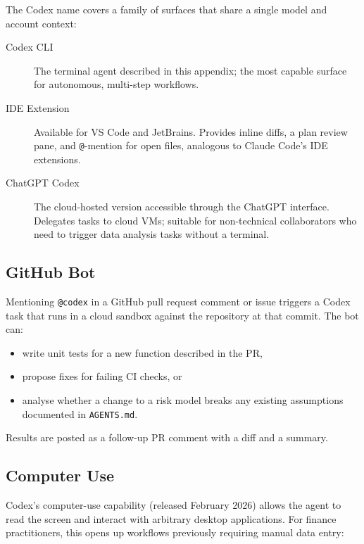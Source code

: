 The Codex name covers a family of surfaces that share a single model and
account context:

\begin{description}
  \item[Codex CLI] The terminal agent described in this appendix; the most
        capable surface for autonomous, multi-step workflows.

  \item[IDE Extension] Available for VS Code and JetBrains.  Provides inline
        diffs, a plan review pane, and \texttt{@}-mention for open files,
        analogous to Claude Code's IDE extensions.

  \item[ChatGPT Codex] The cloud-hosted version accessible through the
        ChatGPT interface.  Delegates tasks to cloud VMs; suitable for
        non-technical collaborators who need to trigger data analysis tasks
        without a terminal.
\end{description}

\subsection{GitHub Bot}
\label{app:codex:github-bot}

Mentioning \texttt{@codex} in a GitHub pull request comment or issue triggers
a Codex task that runs in a cloud sandbox against the repository at that
commit.  The bot can:

\begin{itemize}
  \item write unit tests for a new function described in the PR,
  \item propose fixes for failing CI checks, or
  \item analyse whether a change to a risk model breaks any existing
        assumptions documented in \texttt{AGENTS.md}.
\end{itemize}

Results are posted as a follow-up PR comment with a diff and a summary.

\subsection{Computer Use}
\label{app:codex:computer-use}

Codex's computer-use capability (released February 2026) allows the agent to
read the screen and interact with arbitrary desktop applications.  For finance
practitioners, this opens up workflows previously requiring manual data entry:

